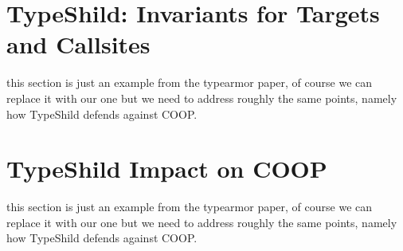 \section{TypeShild: Invariants for Targets and Callsites}
\label{TypeShild: Invariants for Targets and Callsites}
this section is just an example from the typearmor paper, of course we can 
replace it with our one but we need to address roughly the same points, namely
how TypeShild defends against COOP.

\section{TypeShild Impact on COOP}
\label{TypeShild Impact on COOP}
this section is just an example from the typearmor paper, of course we can 
replace it with our one but we need to address roughly the same points, namely
how TypeShild defends against COOP.

